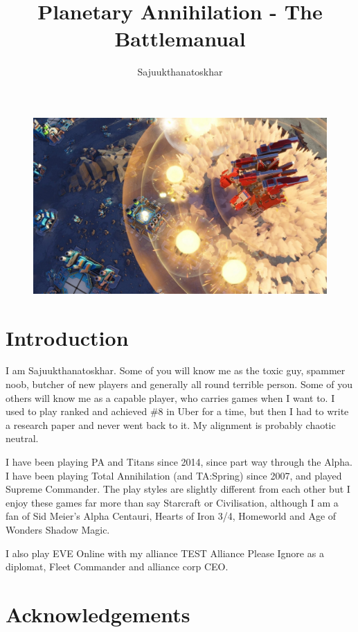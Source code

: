 \documentclass[]{article}
\title{Planetary Annihilation - The Battlemanual}
\author{Sajuukthanatoskhar}
\begin{document}
\maketitle
\begin{figure}[h]
	\centering
	\includegraphics[width=1\linewidth]{5seQd0e}

	\label{fig:5seqd0e}
\end{figure}


\newpage
\tableofcontents
\newpage
\section{Introduction}

I am Sajuukthanatoskhar.  Some of you will know me as the toxic guy, spammer noob, butcher of new players and generally all round terrible person.  Some of you others will know me as a capable player, who carries games when I want to.  I used to play ranked and achieved \#8 in Uber for a time, but then I had to write a research paper and never went back to it.  My alignment is probably chaotic neutral.  

I have been playing PA and Titans since 2014, since part way through the Alpha.  I have been playing Total Annihilation (and TA:Spring) since 2007, and played Supreme Commander.  The play styles are slightly different from each other but I enjoy these games far more than say Starcraft or Civilisation, although I am a fan of Sid Meier's Alpha Centauri, Hearts of Iron 3/4, Homeworld and Age of Wonders Shadow Magic.  

I also play EVE Online with my alliance TEST Alliance Please Ignore as a diplomat, Fleet Commander and alliance corp CEO.  


\section{Acknowledgements}
\end{document}
